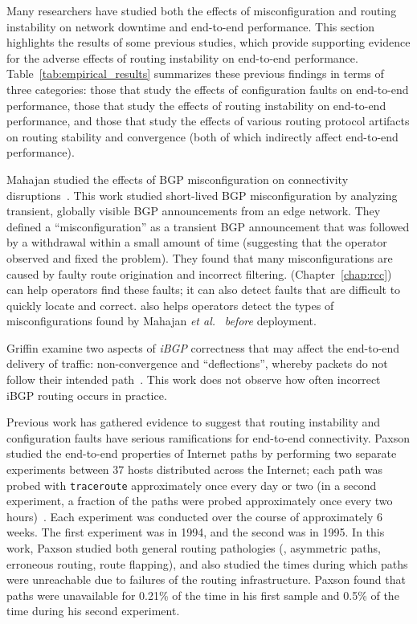 Many researchers have studied both the effects of misconfiguration and
routing instability on network downtime and end-to-end performance.  This
section highlights the results of some previous studies, which provide
supporting evidence for the adverse effects of routing instability on
end-to-end performance.
%
Table~\ref{tab:empirical_results} summarizes these previous findings in
terms of three categories: those that study the effects of configuration
faults on end-to-end performance, those that study the effects of routing
instability on end-to-end performance, and those that study the effects of
various routing protocol artifacts on routing stability and convergence
(both of which indirectly affect end-to-end performance).  

Mahajan \ea studied the effects of BGP misconfiguration on connectivity
disruptions~\cite{Mahajan2002}.  This work studied short-lived BGP
misconfiguration by analyzing transient, globally visible BGP
announcements from an edge network.  They defined a ``misconfiguration''
as a transient BGP announcement that was followed by a withdrawal within
a small amount of time (suggesting that the operator observed and fixed
the problem).  They found that many misconfigurations are caused by
faulty route origination and incorrect filtering.
\rcc (Chapter~\ref{chap:rcc}) can help operators find these faults; it can also
detect faults that are difficult to quickly locate and correct.  \rcc
also helps operators detect the types of misconfigurations found by
Mahajan {\em et al.}~\cite{Mahajan2002} {\em before} deployment.

Griffin \ea examine two aspects of {\em iBGP} correctness that may
affect the end-to-end delivery of traffic: non-convergence and
``deflections'', whereby packets do not follow their intended
path~\cite{Griffin2002}.  This work does not observe how often incorrect
iBGP routing occurs in practice.

Previous work has gathered evidence to suggest that routing
instability and configuration faults have serious
ramifications for end-to-end connectivity.
Paxson studied the end-to-end properties of Internet paths by performing
two separate experiments between $37$ hosts distributed
across the Internet; each path was probed with {\tt traceroute}
approximately once every day or two (in a second experiment, a fraction
of the paths were probed approximately once every two
hours)~\cite{Paxson97}.  Each experiment was conducted over the course
of approximately 6 weeks. The first experiment was in 1994, and the
second was in 1995.  In this work, Paxson studied both general routing
pathologies (\eg, asymmetric paths, erroneous routing, route flapping),
and also studied the times during which paths were 
unreachable due to failures of the routing infrastructure.  Paxson found
that paths were unavailable for 0.21\% of the time 
in his first sample and 0.5\% of the time during his second experiment.

